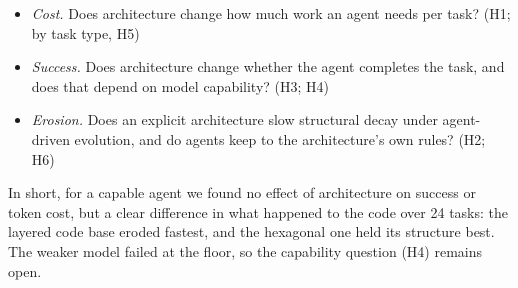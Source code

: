 \documentclass[10pt]{article}
\begin{document}
\begin{itemize}[leftmargin=3.2em,itemsep=1pt]
  \item[\textbf{RQ1}] \emph{Cost.} Does architecture change how much work an agent needs per
    task? (H1; by task type, H5)
  \item[\textbf{RQ2}] \emph{Success.} Does architecture change whether the agent completes the
    task, and does that depend on model capability? (H3; H4)
  \item[\textbf{RQ3}] \emph{Erosion.} Does an explicit architecture slow structural decay under
    agent-driven evolution, and do agents keep to the architecture's own rules? (H2; H6)
\end{itemize}

In short, for a capable agent we found no effect of architecture on success or token cost, but a
clear difference in what happened to the code over 24 tasks: the layered code base eroded fastest,
and the hexagonal one held its structure best. The weaker model failed at the floor, so the
capability question (H4) remains open.
\end{document}

